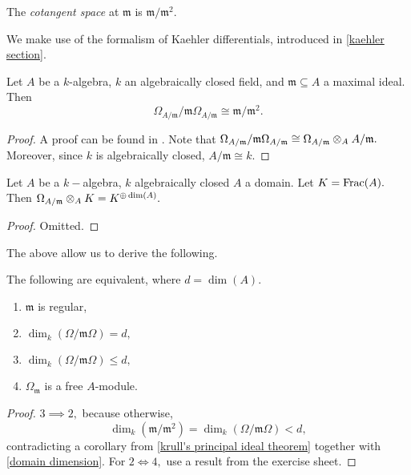 
\begin{df}
  The \emph{cotangent space} at \(\mathfrak m\) is \(\mathfrak m / {\mathfrak m^2}.\)
\end{df}

We make use of the formalism of Kaehler differentials, introduced in \cref{kaehler section}.

\begin{lemma}
  \label{differentials and ideal quotient}
  Let \(A\) be a \(k\)-algebra, \(k\) an algebraically closed field, and \(\mathfrak m \subseteq A\) a maximal ideal. Then
  \[\Omega_{A/{\mathfrak{m}}} /{\mathfrak m \Omega_{A/{\mathfrak{m}}}} \cong \mathfrak m /{\mathfrak m^2}.\]
\end{lemma}
\begin{proof}
  A proof can be found in \cite[Proposition 8.8]{Hartshorne1977}. Note that \(\Omega_{A/{\mathfrak{m}}} /{\mathfrak m \Omega_{A/{\mathfrak{m}}}} \cong \Omega_{A/{\mathfrak{m}}} \otimes_A A/{\mathfrak{m}}.\) Moreover, since \(k\) is algebraically closed, \(A/{\mathfrak{m}} \cong k.\)
\end{proof}

\begin{lemma}
  Let \(A\) be a \(k-\)algebra, \(k\) algebraically closed \(A\) a domain. Let \(K = \mathrm{Frac}(A).\) Then
  \(\Omega_{A/{\mathfrak{m}}} \otimes_A K = K^{\oplus \dim(A)}.\)
\end{lemma}
\begin{proof}
  Omitted.
\end{proof}

The above allow us to derive the following.

\begin{prop}
  \label{prop omega}
  The following are equivalent, where \(d = \dim(A).\)
  \begin{enumerate}
  \item \(\mathfrak m\) is regular,
  \item \(\dim_k(\Omega /{\mathfrak m \Omega}) = d,\)
  \item \(\dim_k(\Omega / {\mathfrak m \Omega}) \leq d,\)
  \item \(\Omega_{\mathfrak m}\) is a free \(A\)-module.
  \end{enumerate}
\end{prop}
\begin{proof}
  \(3 \implies 2,\) because otherwise,
  \[\dim_k(\mathfrak m /{\mathfrak m^2}) = \dim_k(\Omega / {\mathfrak m \Omega}) < d,\]
  contradicting a corollary from \cref{krull's principal ideal theorem} together with \cref{domain dimension}.
  For \(2 \iff 4,\) use a result from the exercise sheet.
\end{proof}

